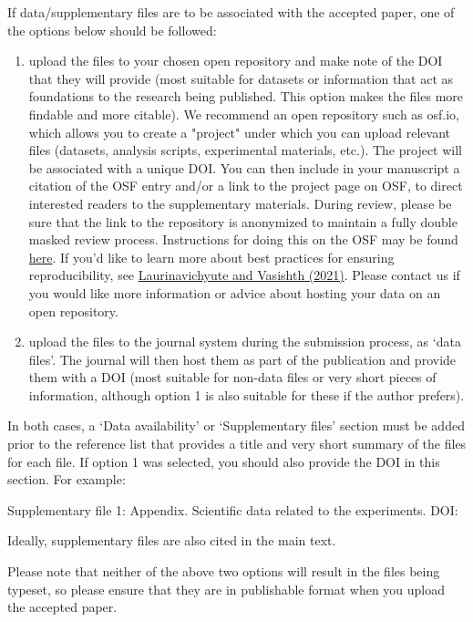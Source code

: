 \documentclass[charis,linguex]{glossa}
\begin{document}
If data/supplementary files are to be associated with the accepted paper, one of the options below should be followed:
\begin{enumerate}
\item upload the files to your chosen open repository and make note of the DOI that they will provide (most suitable for datasets or information that act as foundations to the research being published. This option makes the files more findable and more citable). We recommend an open repository such as osf.io, which allows you to create a "project" under which you can upload relevant files (datasets, analysis scripts, experimental materials, etc.). The project will be associated with a unique DOI. You can then include in your manuscript a citation of the OSF entry and/or a link to the project page on OSF, to direct interested readers to the supplementary materials. During review, please be sure that the link to the repository is anonymized to maintain a fully double masked review process. Instructions for doing this on the OSF may be found \href{https://help.osf.io/hc/en-us/articles/360019930333-Create-a-View-only-Link-for-a-Project}{here}. If you'd like to learn more about best practices for ensuring reproducibility, see \href{https://psyarxiv.com/hf297/}{Laurinavichyute and Vasishth (2021)}. Please contact us if you would like more information or advice about hosting your data on an open repository.
\item upload the files to the journal system during the submission process, as `data files'. The journal will then host them as part of the publication and provide them with a DOI (most suitable for non-data files or very short pieces of information, although option 1 is also suitable for these if the author prefers).
\end{enumerate}

\noindent In both cases, a `Data availability' or `Supplementary files' section must be added prior to the reference list that provides a title and very short summary of the files for each file. If option 1 was selected, you should also provide the DOI in this section. For example:

\noindent Supplementary file 1: Appendix. Scientific data related to the experiments. DOI: 

Ideally, supplementary files are also cited in the main text.

Please note that neither of the above two options will result in the files being typeset, so please ensure that they are in publishable format when you upload the accepted paper.
\end{document}
